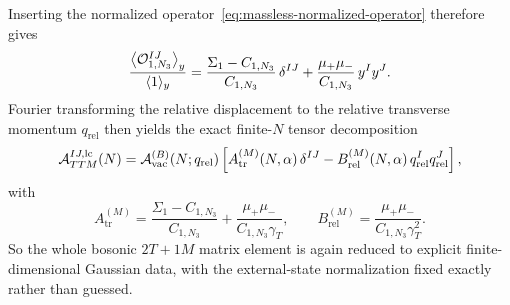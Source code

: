 \documentclass[11pt]{article}
\numberwithin{equation}{section}
\begin{document}
Inserting the normalized operator~\eqref{eq:massless-normalized-operator} therefore gives
\begin{equation}
\label{eq:s12-2-010}
\frac{\bigl\langle {\cal O}_{1,N_3}^{IJ}\bigr\rangle_y}
{\langle 1\rangle_y}
=
\frac{\Sigma_1-C_{1,N_3}}{C_{1,N_3}}\,\delta^{IJ}
+
\frac{\mu_+\mu_-}{C_{1,N_3}}\,y^I y^J.
\end{equation}
Fourier transforming the relative displacement to the relative transverse momentum $q_{\mathrm{rel}}$ then yields the exact finite-$N$ tensor decomposition
\begin{equation}
\label{eq:s12-2-011}
{\cal A}_{TTM}^{IJ,\mathrm{lc}}(N)
=
{\cal A}^{(B)}_{\mathrm{vac}}(N;q_{\mathrm{rel}})
\left[
A_{\mathrm{tr}}^{(M)}(N,\alpha)\,\delta^{IJ}
-B_{\mathrm{rel}}^{(M)}(N,\alpha)\,
q_{\mathrm{rel}}^I q_{\mathrm{rel}}^J
\right],
\end{equation}
with
\begin{equation}
A_{\mathrm{tr}}^{(M)}
=
\frac{\Sigma_1-C_{1,N_3}}{C_{1,N_3}}
+
\frac{\mu_+\mu_-}{C_{1,N_3}\gamma_T},
\qquad
B_{\mathrm{rel}}^{(M)}
=
\frac{\mu_+\mu_-}{C_{1,N_3}\gamma_T^2}.
\label{eq:ttm-bosonic-coefficients}
\end{equation}
So the whole bosonic $2T+1M$ matrix element is again reduced to explicit finite-dimensional Gaussian data, with the external-state normalization fixed exactly rather than guessed.
\end{document}
